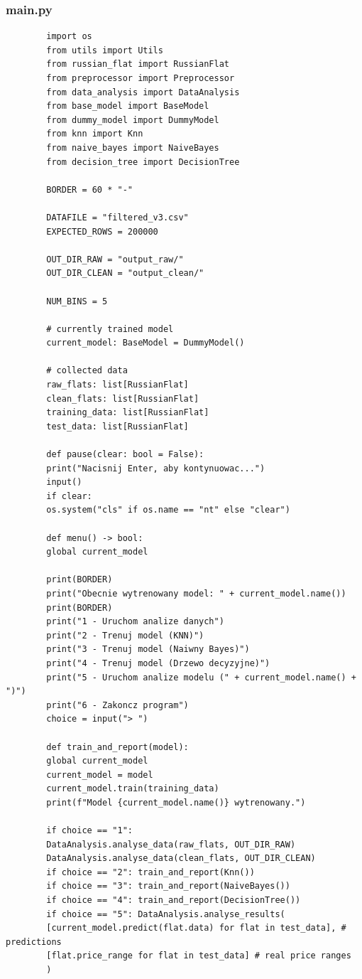 \documentclass[12pt,a4paper]{article}
\begin{document}
	\subsubsection*{main.py}
	\begin{lstlisting}
		import os
		from utils import Utils
		from russian_flat import RussianFlat
		from preprocessor import Preprocessor
		from data_analysis import DataAnalysis
		from base_model import BaseModel
		from dummy_model import DummyModel
		from knn import Knn
		from naive_bayes import NaiveBayes
		from decision_tree import DecisionTree
		
		BORDER = 60 * "-"
		
		DATAFILE = "filtered_v3.csv"
		EXPECTED_ROWS = 200000
		
		OUT_DIR_RAW = "output_raw/"
		OUT_DIR_CLEAN = "output_clean/"
		
		NUM_BINS = 5
		
		# currently trained model
		current_model: BaseModel = DummyModel()
		
		# collected data
		raw_flats: list[RussianFlat]
		clean_flats: list[RussianFlat]
		training_data: list[RussianFlat]
		test_data: list[RussianFlat]
		
		def pause(clear: bool = False):
		print("Nacisnij Enter, aby kontynuowac...")
		input()
		if clear:
		os.system("cls" if os.name == "nt" else "clear")
		
		def menu() -> bool:
		global current_model
		
		print(BORDER)
		print("Obecnie wytrenowany model: " + current_model.name())
		print(BORDER)
		print("1 - Uruchom analize danych")
		print("2 - Trenuj model (KNN)")
		print("3 - Trenuj model (Naiwny Bayes)")
		print("4 - Trenuj model (Drzewo decyzyjne)")
		print("5 - Uruchom analize modelu (" + current_model.name() + ")")
		print("6 - Zakoncz program")
		choice = input("> ")
		
		def train_and_report(model):
		global current_model
		current_model = model
		current_model.train(training_data)
		print(f"Model {current_model.name()} wytrenowany.")
		
		if choice == "1":
		DataAnalysis.analyse_data(raw_flats, OUT_DIR_RAW)
		DataAnalysis.analyse_data(clean_flats, OUT_DIR_CLEAN)
		if choice == "2": train_and_report(Knn())
		if choice == "3": train_and_report(NaiveBayes())
		if choice == "4": train_and_report(DecisionTree())
		if choice == "5": DataAnalysis.analyse_results(
		[current_model.predict(flat.data) for flat in test_data], # predictions
		[flat.price_range for flat in test_data] # real price ranges
		)
		

\end{lstlisting}
\end{document}
